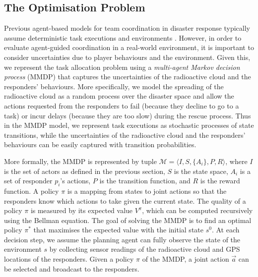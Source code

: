 \subsection{The Optimisation Problem}
\label{sec:model}

Previous agent-based models for team coordination in disaster
response typically assume deterministic task executions and
environments \cite{ramchurn:etal:2010,Scerri2005}. However, in
order to evaluate agent-guided coordination in a real-world
environment, it is important to consider uncertainties due to
player behaviours and the environment. Given this, we represent the
task allocation problem using a {\em multi-agent Markov decision
process} (MMDP) that captures the uncertainties of the radioactive
cloud and the responders' behaviours. More specifically, we model
the spreading of the radioactive cloud as a random process over the
disaster space and allow the actions requested from the responders
to  fail (because they decline to go to a  task) or incur delays
(because they are too slow) during the rescue process. Thus in the
MMDP model, we represent  task executions as stochastic processes
of state transitions, while the uncertainties of the radioactive
cloud and the responders' behaviours can be easily captured with
transition probabilities.

More formally, the MMDP is represented by tuple $\mathcal{M} =
\langle I, S, \{A_i\}, P, R \rangle$, where $I$ is the set of
actors as defined in the previous section,  $S$ is the state space,
$A_i$ is a set of responder $p_i$'s actions, $P$ is the transition
function, and $R$ is the reward function. A policy $\pi$ is a
mapping from states to joint actions so that the responders know
which actions to take given the current state. The quality of a
policy $\pi$ is measured by its expected value $V^\pi$, which can
be computed recursively using the Bellman equation. The goal of
solving the MMDP is to find an optimal policy $\pi^*$ that
maximises the expected value with the initial state $s^0$. At each
decision step, we assume the planning agent can fully observe the
state of the environment $s$ by collecting sensor readings of the
radioactive cloud and GPS locations of the responders. Given a
policy $\pi$ of the MMDP, a joint action $\vec{a}$ can be selected
and broadcast to the responders.
